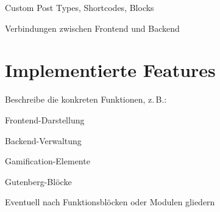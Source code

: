 Custom Post Types, Shortcodes, Blocks

Verbindungen zwischen Frontend und Backend

\section{Implementierte Features}

Beschreibe die konkreten Funktionen, z. B.:

Frontend-Darstellung

Backend-Verwaltung

Gamification-Elemente

Gutenberg-Blöcke

Eventuell nach Funktionsblöcken oder Modulen gliedern

